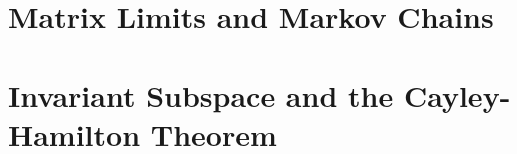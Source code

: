 \vspace{12pt}

\setcounter{Exercise}{6}


\vspace{12pt}

\setcounter{Exercise}{11}


\vspace{12pt}



\vspace{12pt}

\setcounter{Exercise}{17}



\section{Matrix Limits and Markov Chains}


\section{Invariant Subspace and the Cayley-Hamilton
Theorem}